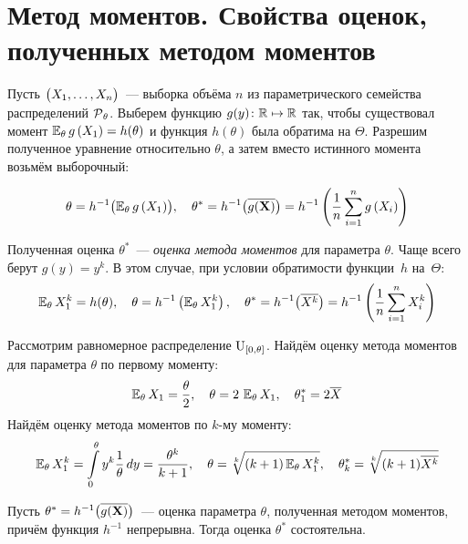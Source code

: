 \section{Метод моментов. Свойства оценок, полученных методом моментов}

Пусть $\bigl(X_1, \ldots, X_n \bigr)$~--- выборка объёма $n$ из параметрического семейства распределений $\operatorname{\mathcal{P}}_\theta$. 
Выберем функцию $g(y)\colon \mathbb{R} \mapsto \mathbb{R}$ так, чтобы существовал момент $\operatorname{\operatorname{\mathbb{E}}_{\theta}} g\left(X_{1}\right)=h(\theta)$ и функция $h(\theta)$ была обратима на $\Theta$. 
Разрешим полученное уравнение относительно $\theta$, а затем вместо истинного момента возьмём выборочный:

\begin{equation*}
    \theta = h^{-1}\bigl(\operatorname{\operatorname{\mathbb{E}}_{\theta}} g\left(X_{1}\right)\bigr), \quad 
    \theta^{*}=h^{-1}\bigl(\overline{g(\mathbf{X})}\bigr) = 
    h^{-1}\left(\frac{1}{n} \sum\limits_{i=1}^{n} g\left(X_{i}\right)\right)
\end{equation*}

Полученная оценка $\theta^{*}$~--- \textit{оценка метода моментов} для параметра $\theta$. 
Чаще всего берут $g(y)=y^{k}$. 
В этом случае, при условии обратимости функции~$h$ на~$\Theta$:
\begin{equation*}
    \operatorname{\operatorname{\mathbb{E}}_{\theta}} X_{1}^{k}=h(\theta), \quad 
    \theta = h^{-1}\left(\operatorname{\operatorname{\mathbb{E}}_{\theta}} X_{1}^{k}\right), \quad 
    \theta^{*} = h^{-1}\bigl( \overline{X^{k}} \bigr) = 
    h^{-1}\left(\frac{1}{n} \sum\limits_{i=1}^{n} X_{i}^{k}\right)
\end{equation*}

\begin{exmp}
    Рассмотрим равномерное распределение $\operatorname{\mathrm{U}}_{[0, \theta]}$. 
    Найдём оценку метода моментов для параметра $\theta$ по первому моменту:
    \begin{equation*}
        \operatorname{\operatorname{\mathbb{E}}_{\theta}} X_{1}=\frac{\theta}{2}, \quad 
        \theta = 2\,\operatorname{\operatorname{\mathbb{E}}_{\theta}} X_{1}, \quad 
        \theta_{1}^{*}=2 \overline{X}
    \end{equation*}
    Найдём оценку метода моментов по $k$-му моменту:
    \begin{equation*}
        \operatorname{\operatorname{\mathbb{E}}_{\theta}} X_{1}^{k} =
        \int\limits_{0}^{\theta} y^{k} \frac{1}{\theta} \, dy = 
        \frac{\theta^{k}}{k+1}, \quad 
        \theta=\sqrt[k]{(k+1) \operatorname{\operatorname{\mathbb{E}}_{\theta}} X_{1}^{k}}, \quad 
        \theta_{k}^{*}=\sqrt[k]{(k+1) \overline{X^{k}}}
    \end{equation*}
\end{exmp}

\begin{thm*}
    Пусть $\theta^{*}=h^{-1}\bigl(\overline{g(\mathbf{X})}\bigr)$~--- оценка параметра $\theta$, полученная методом моментов, причём функция $h^{-1}$ непрерывна. 
    Тогда оценка $\theta^{*}$ состоятельна.
\end{thm*}

